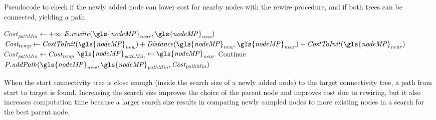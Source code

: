 \begin{algorithm}[H]
\caption{Pseudocode to check if the newly added node can lower cost for nearby nodes with the rewire procedure, and if both trees can be connected, yielding a path.}%
\label{pseudocode:proposed_rrt_star_three}
\begin{algorithmic}[1]
\hspace{-0.9cm}\colorbox{my_green}{\parbox{\linewidth}{%
    \State $\mathit{Cost_{pathMin}} \leftarrow +\infty$
    \State $\mathit{E.rewire(\gls{nodeMP}_{near}, \gls{nodeMP}_{new})}$
        \EndIf
      \Else {}
      \State $\mathit{Cost_{temp} \leftarrow CostToInit(\gls{nodeMP}_{new}) + Distance(\gls{nodeMP}_{new}, \gls{nodeMP}_{near})} + \mathit{CostToInit(\gls{nodeMP}_{near})}$
          \State $\mathit{Cost_{pathMin} \leftarrow \mathit{Cost}_{temp}}$
          \State $\mathit{\gls{nodeMP}_{pathMin} \leftarrow \gls{nodeMP}_{near}}$
          \EndIf
      \EndIf
          \State Continue
      \Else
      \State $\mathit{P.addPath(\gls{nodeMP}_{new}, \gls{nodeMP}_{pathMin}, Cost_{pathMin})}$
      \EndIf
    \EndFor
}}
\end{algorithmic}
\end{algorithm}

When the start connectivity tree is close enough (inside the search size of a newly added node) to the target connectivity tree, a path from start to target is found. Increasing the search size improves the choice of the parent node and improves cost due to rewiring, but it also increases computation time because a larger search size results in comparing newly sampled nodes to more existing nodes in a search for the best parent node.\bs

